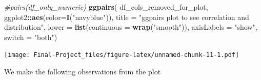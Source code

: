\documentclass[
]{article}
\newenvironment{Shaded}{\begin{snugshade}}{\end{snugshade}}
\newcommand{\CommentTok}[1]{\textcolor[rgb]{0.56,0.35,0.01}{\textit{#1}}}
\newcommand{\ControlFlowTok}[1]{\textcolor[rgb]{0.13,0.29,0.53}{\textbf{#1}}}
\newcommand{\DataTypeTok}[1]{\textcolor[rgb]{0.13,0.29,0.53}{#1}}
\newcommand{\DecValTok}[1]{\textcolor[rgb]{0.00,0.00,0.81}{#1}}
\newcommand{\KeywordTok}[1]{\textcolor[rgb]{0.13,0.29,0.53}{\textbf{#1}}}
\newcommand{\NormalTok}[1]{#1}
\newcommand{\OperatorTok}[1]{\textcolor[rgb]{0.81,0.36,0.00}{\textbf{#1}}}
\newcommand{\StringTok}[1]{\textcolor[rgb]{0.31,0.60,0.02}{#1}}
\begin{document}
\begin{Shaded}
\end{Shaded}

\begin{Shaded}
\begin{Highlighting}[]
\CommentTok{#pairs(df_only_numeric)}
\KeywordTok{ggpairs}\NormalTok{( df_cols_removed_for_plot, ggplot2}\OperatorTok{::}\KeywordTok{aes}\NormalTok{(}\DataTypeTok{color=}\KeywordTok{I}\NormalTok{(}\StringTok{"navyblue"}\NormalTok{)), }\DataTypeTok{title =} \StringTok{"ggpairs plot to see correlation and distribution"}\NormalTok{, }\DataTypeTok{lower =} \KeywordTok{list}\NormalTok{(}\DataTypeTok{continuous =} \KeywordTok{wrap}\NormalTok{(}\StringTok{"smooth"}\NormalTok{)), }\DataTypeTok{axisLabels =} \StringTok{"show"}\NormalTok{, }\DataTypeTok{switch =} \StringTok{"both"}\NormalTok{)}
\end{Highlighting}
\end{Shaded}

\texttt{[image: Final-Project\_files/figure-latex/unnamed-chunk-11-1.pdf]}

We make the following observations from the plot
\end{document}
